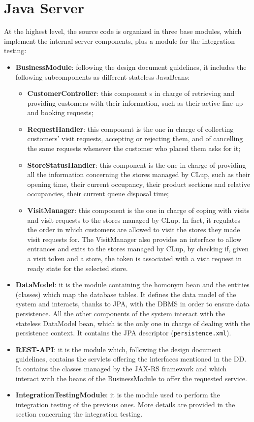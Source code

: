 \documentclass[a4paper,oneside,11pt]{book}
\begin{document}
    \section{Java Server}
    At the highest level, the source code is organized in three base modules, which implement the internal server components, plus a module for the integration testing:
    \begin{itemize}
        \item \textbf{BusinessModule}: following the design document guidelines, it includes the following subcomponents as different stateless JavaBeans:
        \begin{itemize}
            \item \textbf{CustomerController}: this component s in charge of retrieving and providing customers with their information, such as their active line-up and booking requests;
            \item \textbf{RequestHandler}: this component is the one in charge of collecting customers’ visit requests, accepting or rejecting them, and of cancelling the same requests whenever the customer who placed them asks for it;
            \item \textbf{StoreStatusHandler}: this component is the one in charge of providing all the information concerning the stores managed by CLup, such as their opening time, their current occupancy, their product sections and relative occupancies, their current queue disposal time;
            \item \textbf{VisitManager}: this component is the one in charge of coping with visits and visit requests to the stores managed by CLup. In fact, it regulates the order in which customers are allowed to visit the stores they made visit requests for. The VisitManager also provides an interface to allow entrances and exits to the stores managed by CLup, by checking if, given a visit token and a store, the token is associated with a visit request in ready state for the selected store.
        \end{itemize}
        \item \textbf{DataModel}: it is the module containing the homonym bean and the entities (classes) which map the database tables. It defines the data model of the system and interacts, thanks to JPA, with the DBMS in order to ensure data persistence. All the other components of the system interact with the stateless DataModel bean, which is the only one in charge of dealing with the persistence context. It contains the JPA descriptor (\texttt{persistence.xml}).
        \item \textbf{REST-API}: it is the module which, following the design document guidelines, contains the servlets offering the interfaces mentioned in the DD. It contains the classes managed by the JAX-RS framework and which interact with the beans of the BusinessModule to offer the requested service. 
        \item \textbf{IntegrationTestingModule}: it is the module used to perform the integration testing of the previous ones. More details are provided in the section concerning the integration testing.
    \end{itemize}
\end{document}
